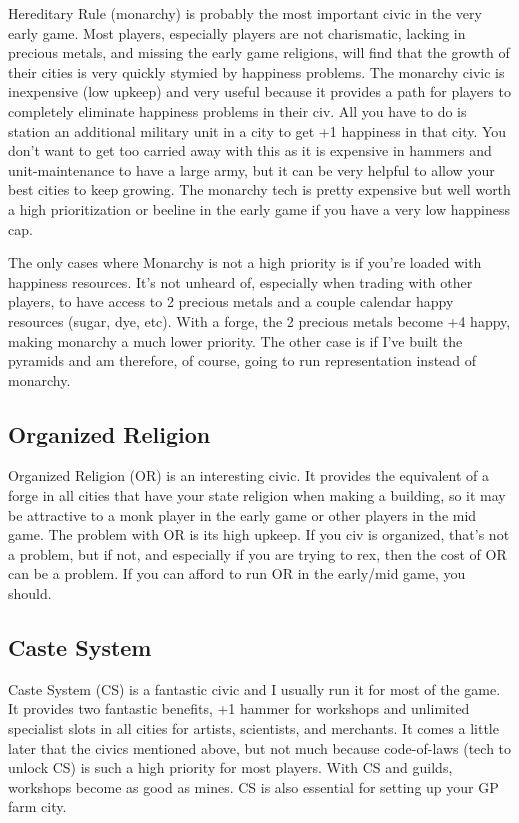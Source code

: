 \documentclass[10pt]{article}
\begin{document}
Hereditary Rule (monarchy) is probably the most important civic in the
very early game. Most players, especially players are not charismatic,
lacking in precious metals, and missing the early game religions, will
find that the growth of their cities is very quickly stymied by
happiness problems. The monarchy civic is inexpensive (low upkeep) and
very useful because it provides a path for players to completely
eliminate happiness problems in their civ. All you have to do is
station an additional military unit in a city to get +1 happiness in
that city. You don't want to get too carried away with this as it is
expensive in hammers and unit-maintenance to have a large army, but it
can be very helpful to allow your best cities to keep growing. The
monarchy tech is pretty expensive but well worth a high prioritization
or beeline in the early game if you have a very low happiness cap.

The only cases where Monarchy is not a high priority is if you're
loaded with happiness resources. It's not unheard of, especially when
trading with other players, to have access to 2 precious metals and a
couple calendar happy resources (sugar, dye, etc). With a forge, the 2
precious metals become +4 happy, making monarchy a much lower
priority. The other case is if I've built the pyramids and am
therefore, of course, going to run representation instead of monarchy.

\subsection*{Organized Religion}

Organized Religion (OR) is an interesting civic. It provides the
equivalent of a forge in all cities that have your state religion when
making a building, so it may be attractive to a monk player in the
early game or other players in the mid game. The problem with OR is
its high upkeep. If you civ is organized, that's not a problem, but if
not, and especially if you are trying to rex, then the cost of OR can
be a problem. If you can afford to run OR in the early/mid game, you
should.

\subsection*{Caste System}

Caste System (CS) is a fantastic civic and I usually run it for most
of the game. It provides two fantastic benefits, +1 hammer for
workshops and unlimited specialist slots in all cities for artists,
scientists, and merchants. It comes a little later that the civics
mentioned above, but not much because code-of-laws (tech to unlock CS)
is such a high priority for most players. With CS and guilds,
workshops become as good as mines. CS is also essential for setting up
your GP farm city.
\end{document}
